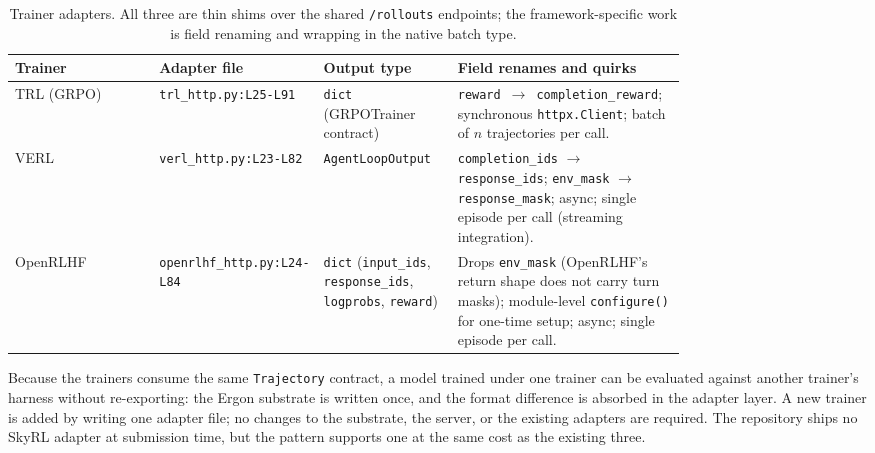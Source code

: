 \documentclass{article}
\begin{document}
\begin{table}[h]
\centering
\small
\caption{Trainer adapters. All three are thin shims over the
shared \texttt{/rollouts} endpoints; the framework-specific
work is field renaming and wrapping in the native batch type.}
\label{tab:adapters}
\begin{tabular}{@{}l>{\raggedright\arraybackslash}p{0.24\linewidth}>{\raggedright\arraybackslash}p{0.20\linewidth}>{\raggedright\arraybackslash}p{0.34\linewidth}@{}}
\toprule
\textbf{Trainer} & \textbf{Adapter file} & \textbf{Output type} & \textbf{Field renames and quirks} \\
\midrule
TRL (GRPO) & \texttt{trl\_http.py:L25-L91} & \texttt{dict} (GRPOTrainer contract) & \texttt{reward}~$\to$~\texttt{completion\_reward}; synchronous \texttt{httpx.Client}; batch of $n$ trajectories per call. \\
VERL       & \texttt{verl\_http.py:L23-L82} & \texttt{AgentLoopOutput} & \texttt{completion\_ids} $\to$ \texttt{response\_ids}; \texttt{env\_mask} $\to$ \texttt{response\_mask}; async; single episode per call (streaming integration). \\
OpenRLHF   & \texttt{openrlhf\_http.py}\allowbreak\texttt{:L24-L84} & \texttt{dict} (\texttt{input\_ids}, \texttt{response\_ids}, \texttt{logprobs}, \texttt{reward}) & Drops \texttt{env\_mask} (OpenRLHF's return shape does not carry turn masks); module-level \texttt{configure()} for one-time setup; async; single episode per call. \\
\bottomrule
\end{tabular}
\end{table}

Because the trainers consume the same \texttt{Trajectory}
contract, a model trained under one trainer can be evaluated
against another trainer's harness without re-exporting: the
Ergon substrate is written once, and the format difference is
absorbed in the adapter layer. A new trainer is added by
writing one adapter file; no changes to the substrate, the
server, or the existing adapters are required. The repository
ships no SkyRL adapter at submission time, but the pattern
supports one at the same cost as the existing three.


\end{document}
